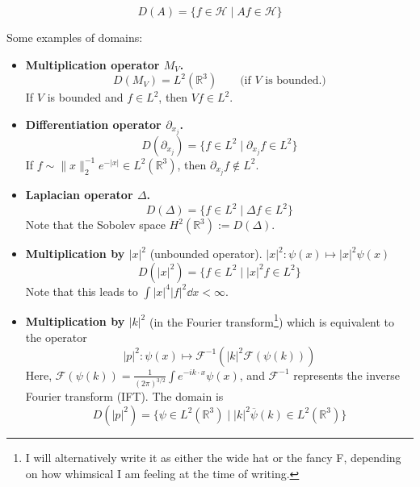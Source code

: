 \documentclass[10pt,a4paper]{report}
\newcommand{\R}{\mathbb{R}}
\begin{document}
\begin{equation}\label{domainA}
    D(A) = \{f\in \mathcal{H} \mid Af \in \mathcal{H}\}
\end{equation}

Some examples of domains:
\begin{itemize}
    \item \textbf{Multiplication operator $M_V$.}
        \begin{equation}
            D(M_V) = L^2 (\R^3) \qquad \text{(if } V \text{ is bounded.)}
        \end{equation}
        If $V$ is bounded and $f\in L^2$, then $Vf \in L^2$.
    \item \textbf{Differentiation operator $\partial_{x_j}$.}
    \begin{equation}
        D(\partial_{x_j}) = \{f\in L^2 \mid \partial_{x_j} f \in L^2\}
    \end{equation}
    If $f \sim \|x\|_2^{-1} e^{-|x|} \in L^2 (\R^3)$, then $\partial_{x_j} f \notin L^2$.
    \item \textbf{Laplacian operator $\Delta$.} 
    \begin{equation}
        D(\Delta) = \{f\in L^2 \mid \Delta f \in L^2\}
    \end{equation}
    Note that the Sobolev space $H^2 (\R^3) := D (\Delta)$.
    \item \textbf{Multiplication by $|x|^2$} (unbounded operator). $|x|^2 \colon \psi (x) \mapsto |x|^2 \psi(x)$
    \begin{equation}
        D(|x|^2) = \{f\in L^2 \mid |x|^2 f \in L^2\}
    \end{equation}
    Note that this leads to $\int |x|^4 |f|^2 \dd x < \infty$.
    \item \textbf{Multiplication by $|k|^2$} (in the Fourier transform\footnote{I will alternatively write it as either the wide hat or the fancy F, depending on how whimsical I am feeling at the time of writing.}) which is equivalent to the operator
    \begin{equation}
        |p|^2 \colon \psi(x) \mapsto \mathcal{F}^{-1}{\left( |k|^2 \mathcal{F}\left({\psi (k)}\right)\right)}
    \end{equation}
    Here, $\mathcal{F}(\psi(k)) = \frac{1}{(2\pi)^{3/2}} \int e^{-ik \cdot x} \psi(x)$, and $\mathcal{F}^{-1}$ represents the inverse Fourier transform (IFT).
    The domain is 
    \begin{equation}
        D(|p|^2) = \{\psi \in L^2 (\R^3) \mid |k|^2 \overline{\psi} (k) \in L^2 (\R^3)\}
    \end{equation}
\end{itemize}
\end{document}
